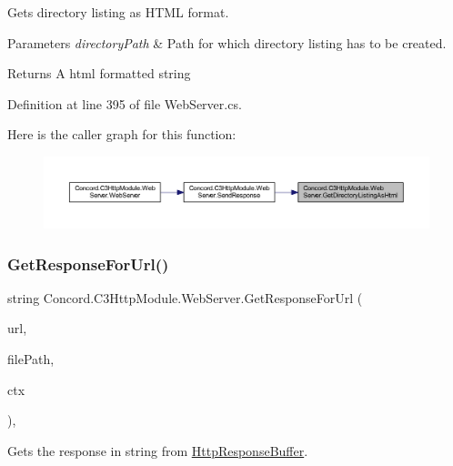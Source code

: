 Gets directory listing as H\+T\+ML format. 


\begin{DoxyParams}{Parameters}
{\em directory\+Path} & Path for which directory listing has to be created.\\
\hline
\end{DoxyParams}
\begin{DoxyReturn}{Returns}
A html formatted string
\end{DoxyReturn}


Definition at line 395 of file Web\+Server.\+cs.

Here is the caller graph for this function\+:
\nopagebreak
\begin{figure}[H]
\begin{center}
\leavevmode
\includegraphics[width=350pt]{class_concord_1_1_c3_http_module_1_1_web_server_a2692917da9b294c53f5151c86409f726_icgraph}
\end{center}
\end{figure}
\mbox{\label{class_concord_1_1_c3_http_module_1_1_web_server_a406b1bfca1b92cedbfb0bdb792ae275f}} 
\subsubsection{\texorpdfstring{GetResponseForUrl()}{GetResponseForUrl()}}
{\footnotesize\ttfamily string Concord.\+C3\+Http\+Module.\+Web\+Server.\+Get\+Response\+For\+Url (\begin{DoxyParamCaption}\item[{string}]{url,  }\item[{string}]{file\+Path,  }\item[{Http\+Listener\+Context}]{ctx }\end{DoxyParamCaption})\hspace{0.3cm}{\ttfamily [inline]}, {\ttfamily [private]}}



Gets the response in string from \mbox{\hyperlink{class_concord_1_1_c3_http_module_1_1_http_response_buffer}{Http\+Response\+Buffer}}. 


